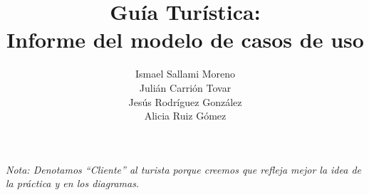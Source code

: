 \documentclass[twoside,openright,titlepage,numbers=noenddot,headinclude,footinclude=true,
cleardoublepage=empty,abstractoff,BCOR=5mm,paper=a4,fontsize=12pt,main=spanish,pdfstartpage=1]{scrreprt}
\author{Ismael Sallami Moreno \\ Julián Carrión Tovar \\ Jesús Rodríguez González \\ Alicia Ruiz Gómez}
\title{Guía Turística: \\ Informe del modelo de casos de uso}
\theoremstyle{plain}
\begin{document}
\maketitle


\onehalfspacing

\tableofcontents
\textit{Nota: Denotamos ``Cliente'' al turista porque creemos que refleja mejor la idea de la práctica y en los diagramas.}












%

\end{document}
